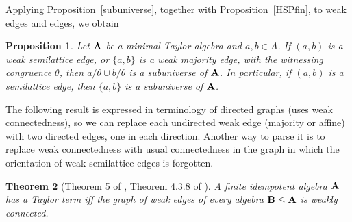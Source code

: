 \documentclass[11pt]{amsart}
\newcommand{\m}[1]{\mathbf{\uppercase{#1}}}
\newtheorem{thm}{Theorem}
\newtheorem{prp}[thm]{Proposition}
\theoremstyle{definition}
\theoremstyle{remark}
\theoremstyle{plain}
\begin{document}
Applying Proposition~\ref{subuniverse}, together with Proposition~\ref{HSPfin}, to weak edges and edges, we obtain

\begin{prp}\label{edgesaresubalgs}
Let $\m a$ be a minimal Taylor algebra and $a,b\in A$. If $(a,b)$ is a weak semilattice edge, or $\{a,b\}$ is a weak majority edge, with the witnessing congruence $\theta$, then $a/\theta\cup b/\theta$ is a subuniverse of $\m a$. In particular, if $(a,b)$ is a semilattice edge, then $\{a,b\}$ is a subuniverse of $\m a$.
\end{prp}

The following result is expressed in terminology of directed graphs (uses weak connectedness), so we can replace each undirected weak edge (majority or affine) with two directed edges, one in each direction. Another way to parse it is to replace weak connectedness with usual connectedness in the graph in which the orientation of weak semilattice edges is forgotten.

\begin{thm}[Theorem 5 of \cite{BulatovGraph1}, Theorem 4.3.8 of \cite{Zebnotes}]\label{connectthm}
A finite idempotent algebra $\m a$ has a Taylor term iff the graph of weak edges of every algebra $\m b\leq \m a$ is weakly connected.
\end{thm}
\end{document}
